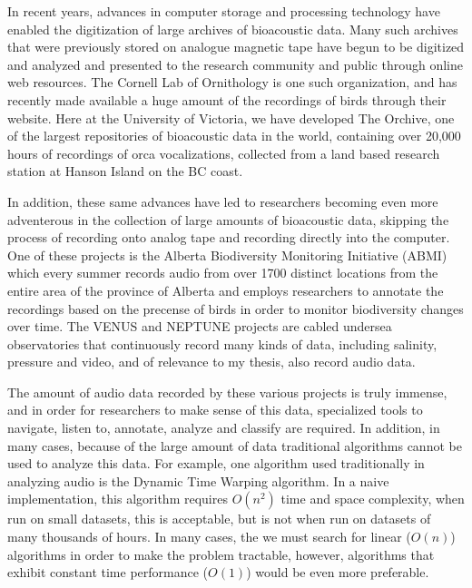 \documentclass[12pt,oneside]{book}
\begin{document}


\newpage



\label{chapter:introduction}

In recent years, advances in computer storage and processing
technology have enabled the digitization of large archives of
bioacoustic data.  Many such archives that were previously stored on
analogue magnetic tape have begun to be digitized and analyzed and
presented to the research community and public through online web
resources.  The Cornell Lab of Ornithology is one such organization,
and has recently made available a huge amount of the recordings of
birds through their website.  Here at the University of Victoria, we
have developed The Orchive, one of the largest repositories of
bioacoustic data in the world, containing over 20,000 hours of
recordings of orca vocalizations, collected from a land based research
station at Hanson Island on the BC coast.

In addition, these same advances have led to researchers becoming even
more adventerous in the collection of large amounts of bioacoustic
data, skipping the process of recording onto analog tape and recording
directly into the computer.  One of these projects is the Alberta
Biodiversity Monitoring Initiative (ABMI) which every summer records
audio from over 1700 distinct locations from the entire area of the
province of Alberta and employs researchers to annotate the recordings
based on the precense of birds in order to monitor biodiversity
changes over time.  The VENUS and NEPTUNE projects are cabled undersea
observatories that continuously record many kinds of data, including
salinity, pressure and video, and of relevance to my thesis, also
record audio data.

The amount of audio data recorded by these various projects is truly
immense, and in order for researchers to make sense of this data,
specialized tools to navigate, listen to, annotate, analyze and
classify are required.  In addition, in many cases, because of the
large amount of data traditional algorithms cannot be used to analyze
this data.  For example, one algorithm used traditionally in analyzing
audio is the Dynamic Time Warping algorithm.  In a naive
implementation, this algorithm requires $O(n^2)$ time and space
complexity, when run on small datasets, this is acceptable, but is not
when run on datasets of many thousands of hours.  In many cases, the
we must search for linear ($O(n)$) algorithms in order to make the
problem tractable, however, algorithms that exhibit constant time
performance ($O(1)$) would be even more preferable.
\end{document}
